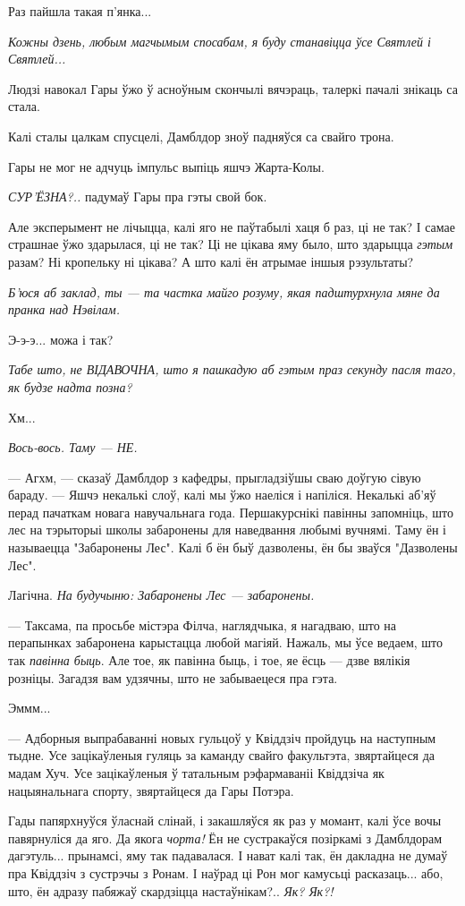 Раз пайшла такая п'янка...

\emph{Кожны дзень, любым магчымым спосабам, я буду станавіцца ўсе Святлей і Святлей...}

Людзі навокал Гары ўжо ў асноўным скончылі вячэраць, талеркі пачалі знікаць са стала.

Калі сталы цалкам спусцелі, Дамблдор зноў падняўся са свайго трона.

Гары не мог не адчуць імпульс выпіць яшчэ Жарта-Колы. 

\emph{СУР'ЁЗНА?..} падумаў Гары пра гэты свой бок.

Але эксперымент не лічыцца, калі яго не паўтабылі хаця б раз, ці не так? 
І самае страшнае ўжо здарылася, ці не так? 
Ці не цікава яму было, што здарыцца \emph{гэтым} разам?
Ні кропельку ні цікава? А што калі ён атрымае іншыя рэзультаты? 


\emph{Б'юся аб заклад, ты --- та частка майго розуму, якая падштурхнула мяне да
пранка над Нэвілам.}

Э-э-э...  можа і так?

\emph{Табе што, не ВІДАВОЧНА, што я пашкадую аб гэтым праз секунду пасля таго, 
як будзе надта позна?}

Хм...

\emph{Вось-вось. Таму --- НЕ.}

--- Агхм, --- сказаў Дамблдор з кафедры, прыгладзіўшы сваю доўгую сівую бараду. ---
Яшчэ некалькі слоў, калі мы ўжо наеліся і напіліся. Некалькі аб'яў перад
пачаткам новага навучальнага года. Першакурснікі павінны запомніць, што 
лес на тэрыторыі школы забаронены для наведвання любымі вучнямі. Таму ён 
і называецца "Забаронены Лес". Калі б ён быў дазволены, ён бы зваўся 
"Дазволены Лес".

Лагічна. \emph{На будучыню: Забаронены Лес --- забаронены.}

--- Таксама, па просьбе містэра Філча, наглядчыка, я нагадваю, што на перапынках 
забаронена карыстацца любой магіяй. Нажаль, мы ўсе ведаем, што так \emph{павінна быць}.
Але тое, як павінна быць, і тое, яе ёсць --- дзве вялікія розніцы. Загадзя вам удзячны,
што не забываецеся пра гэта.

Эммм...

--- Адборныя выпрабаванні новых гульцоў у Квіддзіч пройдуць на наступным тыдне.
Усе зацікаўленыя гуляць за каманду свайго факультэта, звяртайцеся да мадам Хуч.
Усе зацікаўленыя ў татальным рэфармаваніі Квіддзіча як нацыянальнага спорту,
звяртайцеся да Гары Потэра. 

Гады папярхнуўся ўласнай слінай, і закашляўся як раз у момант, калі ўсе вочы
павярнуліся да яго. Да якога \emph{чорта!} Ён не сустракаўся позіркамі з Дамблдорам
дагэтуль... прынамсі, яму так падавалася. І нават калі так, ён дакладна не 
думаў пра Квіддзіч з сустрэчы з Ронам. І наўрад ці Рон мог камусьці расказаць...
або, што, ён адразу пабяжаў скардзіцца настаўнікам?.. \emph{Як? Як?!}

